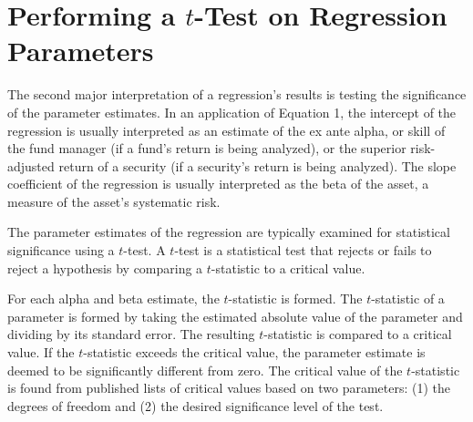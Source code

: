 \documentclass[11pt]{article}
\begin{document}
\section*{Performing a $t$-Test on Regression Parameters}
The second major interpretation of a regression's results is testing the significance of the parameter estimates. In an application of Equation 1, the intercept of the regression is usually interpreted as an estimate of the ex ante alpha, or skill of the fund manager (if a fund's return is being analyzed), or the superior risk-adjusted return of a security (if a security's return is being analyzed). The slope coefficient of the regression is usually interpreted as the beta of the asset, a measure of the asset's systematic risk.

The parameter estimates of the regression are typically examined for statistical significance using a $t$-test. A $t$-test is a statistical test that rejects or fails to reject a hypothesis by comparing a $t$-statistic to a critical value.

For each alpha and beta estimate, the $t$-statistic is formed. The $t$-statistic of a parameter is formed by taking the estimated absolute value of the parameter and dividing by its standard error. The resulting $t$-statistic is compared to a critical value. If the $t$-statistic exceeds the critical value, the parameter estimate is deemed to be significantly different from zero. The critical value of the $t$-statistic is found from published lists of critical values based on two parameters: (1) the degrees of freedom and (2) the desired significance level of the test.
\end{document}
